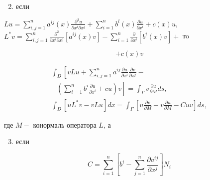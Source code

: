 \documentclass[10pt]{article}
\begin{document}
\begin{enumerate}

  \setcounter{enumi}{1}

  \item если

\end{enumerate}



$L u=\sum_{i, j=1}^{n} a^{i j}(x) \frac{\partial^{2} u}{\partial x^{i} \partial x^{j}}+\sum_{i=1}^{n} b^{l}(x) \frac{\partial u}{\partial x^{i}}+c(x) u$, $L^{*} v=\sum_{i, j=1}^{n} \frac{\partial^{2}}{\partial x^{i} \partial x^{j}}\left[a^{i j}(x) v\right]-\sum_{i=1}^{n} \frac{\partial}{\partial x^{i}}\left[b^{i}(x) v\right]+$ тo



\[

+c(x) v

\]



\[

\begin{gathered}

\int_{D}\left[v L u+\sum_{i, j=1}^{n} a^{i j} \frac{\partial u}{\partial x^{i}} \frac{\partial v}{\partial x^{j}}-\right. \\

\left.-\left(\sum_{i=1}^{n} b^{i} \frac{\partial u}{\partial x^{i}}+c u\right) v\right]=\int_{\Gamma} v \frac{\partial u}{\partial M} d s, \\

\int_{D}\left[u L^{*} v-v L u\right] d x=\int_{\Gamma}\left[u \frac{\partial v}{\partial M}-v \frac{\partial u}{\partial M}-C u v\right] d s,

\end{gathered}

\]



где $M-$ конормаль оператора $L$, а



\begin{enumerate}

  \setcounter{enumi}{2}

  \item если

\end{enumerate}



\[

C=\sum_{i=1}^{n}\left[b^{i}-\sum_{j=1}^{n} \frac{\partial a^{i j}}{\partial x^{j}}\right] N_{i}

\]
\end{document}
